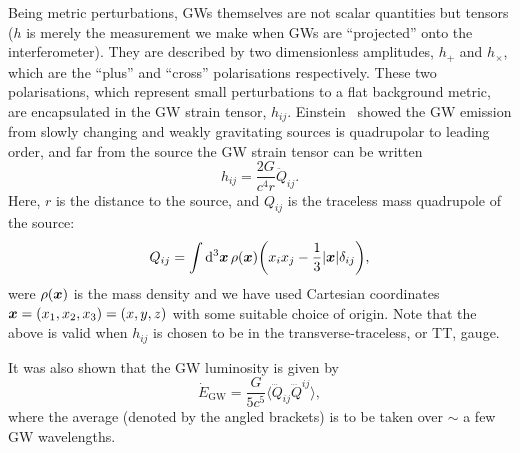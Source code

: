 Being metric perturbations, GWs themselves are not scalar quantities but tensors ($h$ is merely the measurement we make when GWs are ``projected'' onto the interferometer).
They are described by two dimensionless amplitudes, $h_+$ and $h_\times$, which are the ``plus'' and ``cross'' polarisations respectively.
These two polarisations, which represent small perturbations to a flat background metric, are encapsulated in the GW strain tensor, $h_{ij}$.
Einstein~\cite{Einstein:1918btx} showed the GW emission from slowly changing and weakly gravitating sources is quadrupolar to leading order, and far from the source the GW strain tensor can be written
\begin{equation}\label{ch1:eq:quadrupole_strain}
    h_{ij} = \frac{2G}{c^4 r}\ddot{Q}_{ij}.
\end{equation}
Here, $r$ is the distance to the source, and $Q_{ij}$ is the traceless mass quadrupole of the source:
\begin{equation}\label{ch1:eq:quadrupole}
    Q_{ij} = \int \dd[3]{\vb*{x}} \rho(\vb*{x}) \qty(x_i x_j - \frac{1}{3} \abs{\vb*{x}} \delta_{ij}),
\end{equation}
were $\rho(\vb*{x})$ is the mass density and we have used Cartesian coordinates $\vb*{x} = (x_1, x_2, x_3) = (x,y,z)$ with some suitable choice of origin.
Note that the above is valid when $h_{ij}$ is chosen to be in the transverse-traceless, or TT, gauge.

It was also shown that the GW luminosity is given by
\begin{equation}\label{ch1:eq:gw_luminosity}
    \dot{E}_\mathrm{GW} = \frac{G}{5c^5} \bigl \langle \dddot{Q}_{ij} \dddot{Q}^{ij} \bigr \rangle,
\end{equation}
where the average (denoted by the angled brackets) is to be taken over $\sim$ a few GW wavelengths.

